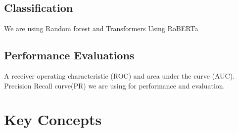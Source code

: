 \subsection{ Classification}

We are using Random forest and Transformers Using RoBERTa

\subsection{Performance Evaluations }

A receiver operating characteristic (ROC) and area under the curve (AUC).
Precision Recall curve(PR) we are using for performance and evaluation.
\section{Key Concepts}
